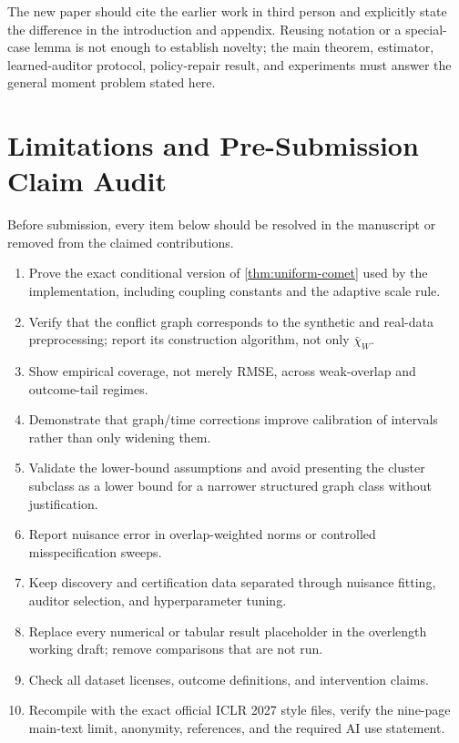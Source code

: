 The new paper should cite the earlier work in third person and explicitly state the difference in the introduction and appendix. Reusing notation or a special-case lemma is not enough to establish novelty; the main theorem, estimator, learned-auditor protocol, policy-repair result, and experiments must answer the general moment problem stated here.

\section{Limitations and Pre-Submission Claim Audit}
\label{app:limitations}

Before submission, every item below should be resolved in the manuscript or removed from the claimed contributions.
\begin{enumerate}[leftmargin=1.5em,itemsep=2pt]
    \item Prove the exact conditional version of \cref{thm:uniform-comet} used by the implementation, including coupling constants and the adaptive scale rule.
    \item Verify that the conflict graph corresponds to the synthetic and real-data preprocessing; report its construction algorithm, not only $\bar\chi_W$.
    \item Show empirical coverage, not merely RMSE, across weak-overlap and outcome-tail regimes.
    \item Demonstrate that graph/time corrections improve calibration of intervals rather than only widening them.
    \item Validate the lower-bound assumptions and avoid presenting the cluster subclass as a lower bound for a narrower structured graph class without justification.
    \item Report nuisance error in overlap-weighted norms or controlled misspecification sweeps.
    \item Keep discovery and certification data separated through nuisance fitting, auditor selection, and hyperparameter tuning.
    \item Replace every numerical or tabular result placeholder in the overlength working draft; remove comparisons that are not run.
    \item Check all dataset licenses, outcome definitions, and intervention claims.
    \item Recompile with the exact official ICLR 2027 style files, verify the nine-page main-text limit, anonymity, references, and the required AI use statement.
\end{enumerate}


